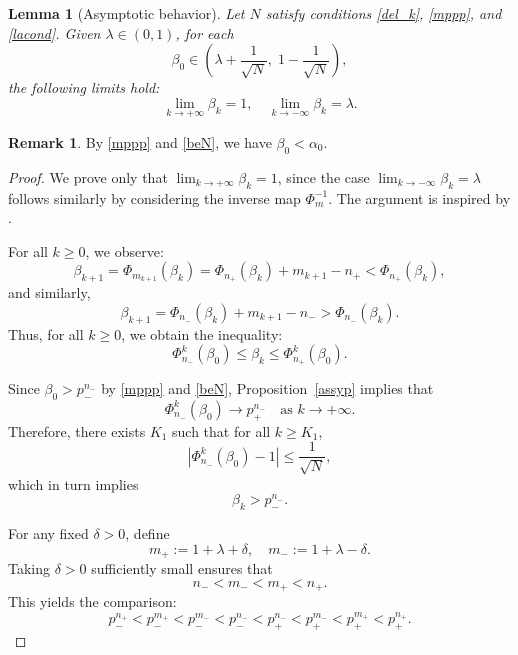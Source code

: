 \documentclass{amsart}
\newtheorem{Lemma}[Definition]{Lemma}
\theoremstyle{definition}
\newtheorem{Remark}[Definition]{Remark}
\begin{document}
\begin{Lemma}[Asymptotic behavior]\label{forwap}
Let $N$ satisfy conditions \eqref{del_k}, \eqref{mppp}, and \eqref{lacond}. Given $\lambda \in (0,1)$, for each
\begin{equation}\label{beN}
\beta_0 \in \left( \lambda + \frac{1}{\sqrt{N}},\; 1 - \frac{1}{\sqrt{N}} \right),
\end{equation}
the following limits hold:
\[
\lim_{k \to +\infty} \beta_k = 1, \quad \lim_{k \to -\infty} \beta_k = \lambda.
\]
\end{Lemma}

\begin{Remark}
By \eqref{mppp} and \eqref{beN}, we have $\beta_0 < \alpha_0$.
\end{Remark}

\begin{proof}
We prove only that $\lim_{k \to +\infty} \beta_k = 1$, since the case $\lim_{k \to -\infty} \beta_k = \lambda$ follows similarly by considering the inverse map $\Phi_m^{-1}$. The argument is inspired by \cite[Lemma 1]{Ar11}.

For all $k \geq 0$, we observe:
\[
\beta_{k+1} = \Phi_{m_{k+1}}(\beta_k) = \Phi_{n_+}(\beta_k) + m_{k+1} - n_+ < \Phi_{n_+}(\beta_k),
\]
and similarly,
\[
\beta_{k+1} = \Phi_{n_-}(\beta_k) + m_{k+1} - n_- > \Phi_{n_-}(\beta_k).
\]
Thus, for all $k \geq 0$, we obtain the inequality:
\begin{equation}\label{leqq}
\Phi_{n_-}^k(\beta_0) \leq \beta_k \leq \Phi_{n_+}^k(\beta_0).
\end{equation}

Since $\beta_0 > p_-^{n_-}$ by \eqref{mppp} and \eqref{beN}, Proposition~\ref{assyp} implies that
\[
\Phi_{n_-}^k(\beta_0) \to p_+^{n_-} \quad \text{as } k \to +\infty.
\]
Therefore, there exists $K_1$ such that for all $k \geq K_1$,
\[
|\Phi_{n_-}^k(\beta_0) - 1| \leq \frac{1}{\sqrt{N}},
\]
which in turn implies
\begin{equation}\label{bkpln}
\beta_k > p_-^{n_-}.
\end{equation}

For any fixed $\delta > 0$, define
\[
m_+ := 1 + \lambda + \delta, \quad m_- := 1 + \lambda - \delta.
\]
Taking $\delta > 0$ sufficiently small ensures that
\[
n_- < m_- < m_+ < n_+.
\]
This yields the comparison:
\begin{equation}\label{pcompar}
p_-^{n_+} < p_-^{m_+} < p_-^{m_-} < p_-^{n_-} < p_+^{n_-} < p_+^{m_-} < p_+^{m_+} < p_+^{n_+}.
\end{equation}


\end{proof}
\end{document}
